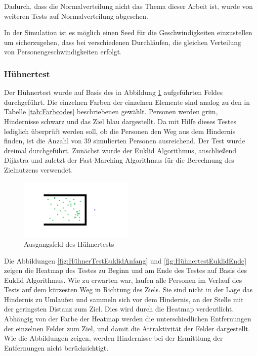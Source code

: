Dadurch, dass die Normalverteilung nicht das Thema dieser Arbeit ist, wurde von weiteren Tests auf Normalverteilung abgesehen.

In der Simulation ist es möglich einen Seed für die Geschwindigkeiten einzustellen um sicherzugehen, dass bei verschiedenen Durchläufen, die gleichen Verteilung von Personengeschwindigkeiten erfolgt.



\subsubsection{Hühnertest}
Der Hühnertest wurde auf Basis des in Abbildung \ref{fig:HühnertestMap} aufgeführten Feldes durchgeführt. Die einzelnen Farben der einzelnen Elemente sind analog zu den in Tabelle \ref{tab:Farbcodes} beschriebenen gewählt. Personen werden grün, Hindernisse schwarz und das Ziel blau dargestellt. Da mit Hilfe dieses Testes lediglich überprüft werden soll, ob die Personen den Weg aus dem Hindernis finden, ist die Anzahl von $39$ simulierten Personen ausreichend. Der Test wurde dreimal durchgeführt. Zunächst wurde der Euklid Algorithmus, anschließend Dijkstra und zuletzt der Fast-Marching Algorithmus für die Berechnung des Zielnutzens verwendet.

\begin{figure}[htpb]
	\centering
	\includegraphics[width=0.5\textwidth]{abbildungen/HuehnertestMap.png}
	\caption{Ausgangsfeld des Hühnertests}
	\label{fig:HühnertestMap}
\end{figure}

Die Abbildungen \ref{fig:HühnerTestEuklidAnfang} und \ref{fig:HühnertestEuklidEnde} zeigen die Heatmap des Testes zu Beginn und am Ende des Testes auf Basis des Euklid Algorithmus. Wie zu erwarten war, laufen alle Personen im Verlauf des Tests auf dem kürzesten Weg in Richtung des Ziels. Sie sind nicht in der Lage das Hindernis zu Umlaufen und sammeln sich vor dem Hindernis, an der Stelle mit der geringsten Distanz zum Ziel. Dies wird durch die Heatmap verdeutlicht. Abhängig von der Farbe der Heatmap werden die unterschiedlichen Entfernungen der einzelnen Felder zum Ziel, und damit die Attraktivität der Felder dargestellt. Wie die Abbildungen zeigen, werden Hindernisse bei der Ermittlung der Entfernungen nicht berücksichtigt.
 
